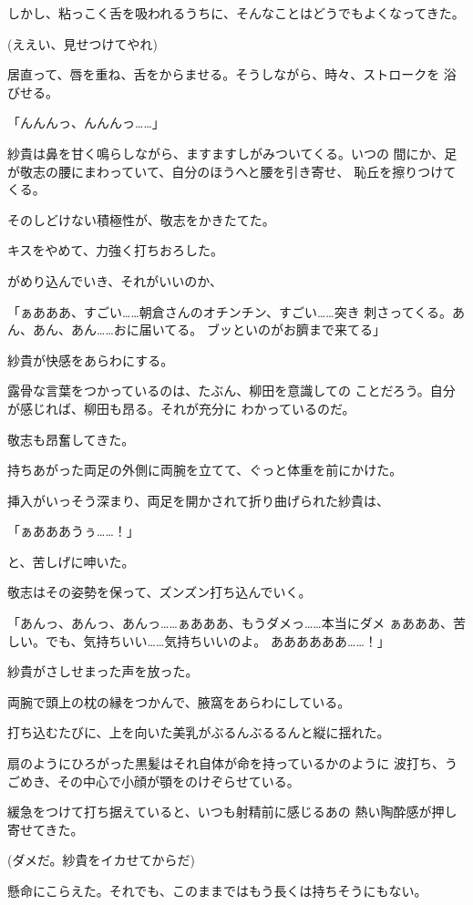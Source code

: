 ﻿\documentclass[
    book,tate,
    line_length=30zw,
    jafontsize=12pt,
    paper=b5j,
    landscape,
    ]{jlreq}
\begin{document}
しかし、粘っこく舌を吸われるうちに、そんなことはどうでもよくなってきた。

(ええい、見せつけてやれ)

居直って、唇を重ね、舌をからませる。そうしながら、時々、ストロークを
浴びせる。

「んんんっ、んんんっ……」

紗貴は鼻を甘く鳴らしながら、ますますしがみついてくる。いつの
間にか、足が敬志の腰にまわっていて、自分のほうへと腰を引き寄せ、
恥丘を擦りつけてくる。

そのしどけない積極性が、敬志をかきたてた。

キスをやめて、力強く打ちおろした。

がめり込んでいき、それがいいのか、

「ぁあああ、すごい……朝倉さんのオチンチン、すごい……突き
刺さってくる。あん、あん、あん……おに届いてる。
ブッといのがお臍まで来てる」

紗貴が快感をあらわにする。

露骨な言葉をつかっているのは、たぶん、柳田を意識しての
ことだろう。自分が感じれば、柳田も昂る。それが充分に
わかっているのだ。

敬志も昂奮してきた。

持ちあがった両足の外側に両腕を立てて、ぐっと体重を前にかけた。

挿入がいっそう深まり、両足を開かされて折り曲げられた紗貴は、

「ぁあああうぅ……！」

と、苦しげに呻いた。

敬志はその姿勢を保って、ズンズン打ち込んでいく。

「あんっ、あんっ、あんっ……ぁあああ、もうダメっ……本当にダメ
ぁあああ、苦しい。でも、気持ちいい……気持ちいいのよ。
ああああああ……！」

紗貴がさしせまった声を放った。

両腕で頭上の枕の縁をつかんで、腋窩をあらわにしている。

打ち込むたびに、上を向いた美乳がぶるんぶるるんと縦に揺れた。

扇のようにひろがった黒髪はそれ自体が命を持っているかのように
波打ち、うごめき、その中心で小顔が顎をのけぞらせている。

緩急をつけて打ち据えていると、いつも射精前に感じるあの
熱い陶酔感が押し寄せてきた。

(ダメだ。紗貴をイカせてからだ)

懸命にこらえた。それでも、このままではもう長くは持ちそうにもない。
\end{document}
